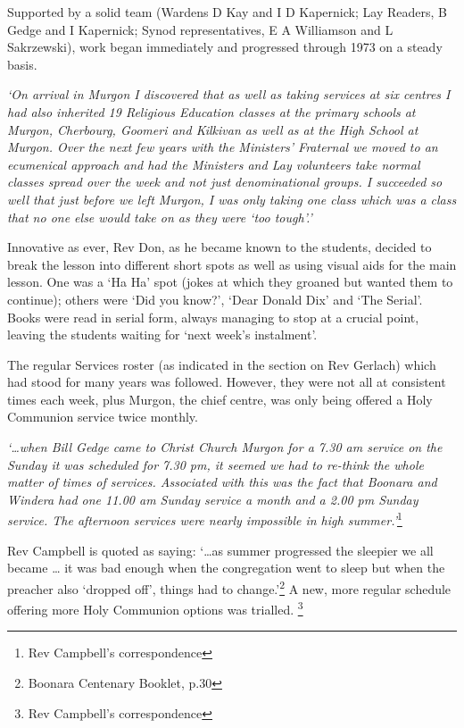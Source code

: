 Supported by a solid team (Wardens D Kay and I D Kapernick; Lay Readers, B Gedge and I Kapernick; Synod representatives, E A Williamson and L Sakrzewski), work began immediately and progressed through 1973 on a steady basis.

\emph{`On arrival in Murgon I discovered that as well as taking services at six centres I had also inherited 19 Religious Education classes at the primary schools at Murgon, Cherbourg, Goomeri and Kilkivan as well as at the High School at Murgon. Over the next few years with the Ministers' Fraternal we moved to an ecumenical approach and had the Ministers and Lay volunteers take normal classes spread over the week and not just denominational groups. I succeeded so well that just before we left Murgon, I was only taking one class which was a class that no one else would take on as they were `too tough'.'}

Innovative as ever, Rev Don, as he became known to the students, decided to break the lesson into different short spots as well as using visual aids for the main lesson. One was a `Ha Ha' spot (jokes at which they groaned but wanted them to continue); others were `Did you know?', `Dear Donald Dix' and `The Serial'. Books were read in serial form, always managing to stop at a crucial point, leaving the students waiting for `next week's instalment'.

The regular Services roster (as indicated in the section on Rev Gerlach) which had stood for many years was followed. However, they were not all at consistent times each week, plus Murgon, the chief centre, was only being offered a Holy Communion service twice monthly.

\emph{`\ldots when Bill Gedge came to Christ Church Murgon for a 7.30 am service on the Sunday it was scheduled for 7.30 pm, it seemed we had to re-think the whole matter of times of services. Associated with this was the fact that Boonara and Windera had one 11.00 am Sunday service a month and a 2.00 pm Sunday service. The afternoon services were nearly impossible in high summer.'}\footnote{Rev Campbell's correspondence}

Rev Campbell is quoted as saying: `\ldots as summer progressed the sleepier we all became \ldots{} it was bad enough when the congregation went to sleep but when the preacher also `dropped off', things had to change.'\footnote{Boonara Centenary Booklet, p.30} A new, more regular schedule offering more Holy Communion options was trialled. \footnote{Rev Campbell's correspondence}

